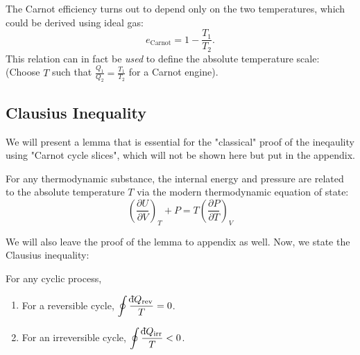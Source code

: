 The Carnot efficiency turns out to depend only on the two temperatures, which could be derived using ideal gas: 
\[
    e_{\text{Carnot}} = 1 - \frac{T_1}{T_2}.
\]
This relation can in fact be \emph{used} to define the absolute temperature scale: (Choose $T$ such that $\frac{Q_1}{Q_2} = \frac{T_1}{T_2}$ for a Carnot engine).

\subsection{Clausius Inequality}
We will present a lemma that is essential for the "classical" proof of the ineqaulity using "Carnot cycle slices", 
which will not be shown here but put in the appendix. 
\begin{lemma}
For any thermodynamic substance, the internal energy and pressure are related to the absolute temperature $T$ via the modern thermodynamic equation of state:
\[
\left(\frac{\partial U}{\partial V}\right)_T + P = T\left(\frac{\partial P}{\partial T}\right)_V
\]
\end{lemma}

We will also leave the proof of the lemma to appendix as well. Now, we state the Clausius inequality: 

\begin{theorem}
    For any cyclic process, 
    \begin{enumerate}
        \item For a reversible cycle, $\displaystyle \oint \frac{\dbar Q_{\text{rev}}}{T} = 0$.
        \item For an irreversible cycle, $\displaystyle \oint \frac{\dbar Q_{\text{irr}}}{T} < 0$.
    \end{enumerate}
\end{theorem}


